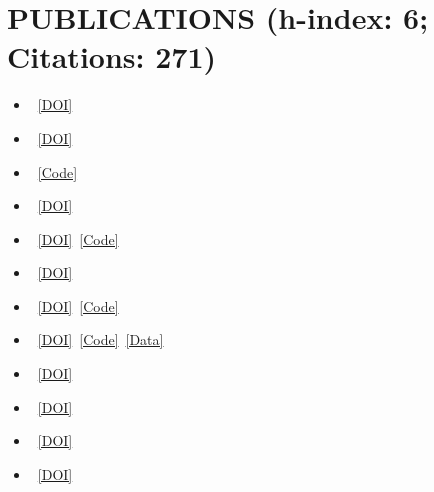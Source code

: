 \documentclass[letterpaper,11pt]{article}
\newcommand{\doiLink}[1]{\href{https://doi.org/#1}{[DOI]}}
\newcommand{\codeLink}[1]{\href{#1}{[Code]}}
\newcommand{\dataLink}[1]{\href{#1}{[Data]}}
\begin{document}

\section{PUBLICATIONS (h-index: 6; Citations: 271)\texorpdfstring{ {\normalfont\large\href{https://scholar.google.com/citations?user=n1b1vOMAAAAJ\&hl=en\&authuser=1}{\textcolor{scholar}{\faGraduationCap}}\hspace{0.45em}\href{https://www.researchgate.net/profile/Pedram-Beigi-3?ev=hdr_xprf}{\textcolor{researchgate}{\faResearchgate}}}}{}}
\begin{itemize}[leftmargin=0.15in, label={}]
    \setlength{\itemsep}{-1pt} %

    \item {}~\doiLink{10.1016/j.trpro.2025.11.102}

    \item {}~\doiLink{10.1109/TITS.2026.3655561}
    \item {}~\codeLink{https://github.com/pebeigi/Paper_GA_RL_VRU_Calibration}
    \item {}~\doiLink{10.1109/ICMI65310.2025.11139838}
    \item {}~\doiLink{10.1177/03611981251324198}~\codeLink{https://github.com/pebeigi/Paper_Impact_of_Heavy_Vehicles_on_Headway}

    \item {}~\doiLink{10.1080/23249935.2025.2558149}
    \item {}~\doiLink{10.1177/03611981251384965}~\codeLink{https://github.com/wissamsleiman/Deep-Reinforcement-Learning-for-Traffic-Signal-Control}
    \item {}~\doiLink{10.1177/03611981241257257}~\codeLink{https://github.com/ylinzhang12/TGSIM-trajectory-pipeline}~\dataLink{https://catalog.data.gov/dataset/third-generation-simulation-data-tgsim}
    
    \item {}~\href{https://www.atsinternationaljournal.com/2024-issues/predicting-freight-attraction-with-multivariate-linear-regression-and-geographically-weighted-regression-using-satellite-nighttime-light-data/}{[DOI]}

    \item {}~\doiLink{10.1155/2022/8781686}
    
    \item {}~\doiLink{10.1007/978-3-031-34027-7_48}
    \item {}~\doiLink{10.1007/978-3-031-34027-7_41}
    
\end{itemize}
\end{document}
